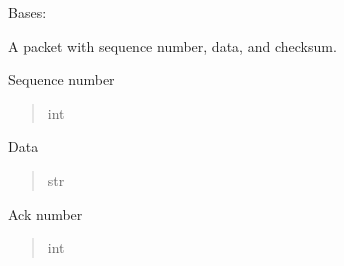 \documentclass[letterpaper,10pt,english]{sphinxmanual}
\begin{document}
\begin{fulllineitems}
\label{\detokenize{packet:packet.Packet}}
\pysigstartsignatures
\pysiglinewithargsret
{}
{\sphinxparamcomma {}\sphinxparamcomma {}\sphinxparamcomma {}}
{}
\pysigstopsignatures
\sphinxAtStartPar
Bases: 

\sphinxAtStartPar
A packet with sequence number, data, and checksum.

\begin{fulllineitems}
\label{\detokenize{packet:packet.Packet.seq_num}}
\pysigstartsignatures
\pysigline
{}
\pysigstopsignatures
\sphinxAtStartPar
Sequence number
\begin{quote}\begin{description}
\sphinxAtStartPar
int

\end{description}\end{quote}

\end{fulllineitems}


\begin{fulllineitems}
\label{\detokenize{packet:packet.Packet.data}}
\pysigstartsignatures
\pysigline
{}
\pysigstopsignatures
\sphinxAtStartPar
Data
\begin{quote}\begin{description}
\sphinxAtStartPar
str

\end{description}\end{quote}

\end{fulllineitems}


\begin{fulllineitems}
\label{\detokenize{packet:packet.Packet.ack_num}}
\pysigstartsignatures
\pysigline
{}
\pysigstopsignatures
\sphinxAtStartPar
Ack number
\begin{quote}\begin{description}
\sphinxAtStartPar
int


\end{description}
\end{quote}
\end{fulllineitems}
\end{fulllineitems}
\end{document}
